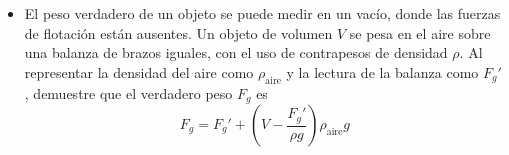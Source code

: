 \documentclass[11pt,a4paper]{article}
\begin{document}
\begin{itemize}
    \vspace*{8cm}
    
    \item[\textbf{34.}] El peso verdadero de un objeto se puede medir en un vacío, donde las fuerzas de flotación están ausentes. Un objeto de volumen \(V\) se pesa en el aire sobre una balanza de brazos iguales, con el uso de contrapesos de densidad \(\rho\). Al representar la densidad del aire como \(\rho_{\text{aire}}\) y la lectura de la balanza como \(F_g'\), demuestre que el verdadero peso \(F_g\) es
    \[
    F_g = F_g' + \left( V - \frac{F_g'}{\rho g} \right) \rho_{\text{aire}} g
    \]
    \vspace*{7cm}
\end{itemize}

\newpage
\end{document}
